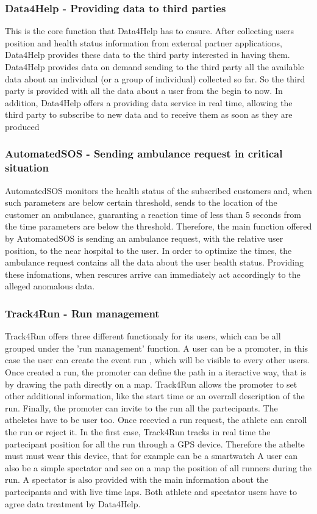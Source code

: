 \subsubsection{Data4Help - Providing data to third parties }
This is the core function that Data4Help has to ensure. After collecting users position and health status information from external partner applications, Data4Help provides these data to the third party interested in having them. Data4Help provides data on demand sending to the third party all the available data about an individual (or a group of individual) collected so far. So the third party is provided with all the data about a user from the begin to now. In addition, Data4Help offers a providing data service in real time, allowing the third party to subscribe to new data and to receive them as soon as they are produced

\subsubsection{AutomatedSOS - Sending ambulance request in critical situation}
AutomatedSOS monitors the health status of the subscribed customers and, when such parameters are below certain threshold, sends to the location of the customer an ambulance, guaranting a reaction time of less than 5 seconds from the time parameters are below the threshold.
\bigbreak
\noindent
Therefore, the main function offered by AutomatedSOS is sending an ambulance request, with the relative user position, to the near hospital to the user. In order to optimize the times, the ambulance request contains all the data about the user health status. Providing these infomations, when rescures arrive can immediately act accordingly to the alleged anomalous data.
\subsubsection{Track4Run - Run management}
Track4Run offers three different functionaly for its users, which can be all grouped under the 'run management' function. A user can be a promoter, in this case the user can create the event run , which will be visible to every other users. Once created a run, the promoter can define the path in a iteractive way, that is by drawing the path directly on a map. Track4Run allows the promoter to set other additional information, like the start time or an overrall description of the run. Finally, the promoter can invite to the run all the partecipants. 
\bigbreak
\noindent
The atheletes have to be user too. Once recevied a run request, the athlete can enroll the run or reject it. In the first case, Track4Run tracks in real time the partecipant position for all the run through a GPS device. Therefore the athelte must must wear this device, that for example can be a smartwatch
\bigbreak
\noindent
A user can also be a simple spectator and see on a map the position of all runners during the run. A spectator is also provided with the main information about the partecipants and with live time laps.
\bigbreak
\noindent
Both athlete and spectator users have to agree data treatment by Data4Help. 

